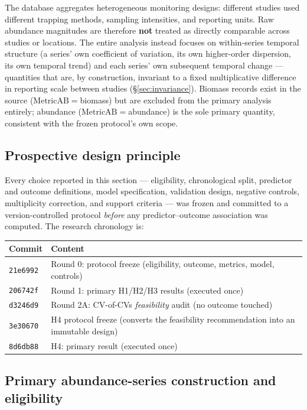 \documentclass[11pt]{article}
\begin{document}
The database aggregates heterogeneous monitoring designs: different
studies used different trapping methods, sampling intensities, and
reporting units. Raw abundance magnitudes are therefore \textbf{not}
treated as directly comparable across studies or locations. The entire
analysis instead focuses on within-series temporal structure (a series'
own coefficient of variation, its own higher-order dispersion, its own
temporal trend) and each series' own subsequent temporal change ---
quantities that are, by construction, invariant to a fixed multiplicative
difference in reporting scale between studies (\S\ref{sec:invariance}).
Biomass records exist in the source ($\mathrm{MetricAB}=$biomass) but are
excluded from the primary analysis entirely; abundance
($\mathrm{MetricAB}=$abundance) is the sole primary quantity, consistent
with the frozen protocol's own scope.

\subsection{Prospective design principle}

Every choice reported in this section --- eligibility, chronological
split, predictor and outcome definitions, model specification, validation
design, negative controls, multiplicity correction, and support criteria
--- was frozen and committed to a version-controlled protocol
\emph{before} any predictor--outcome association was computed. The
research chronology is:

\begin{center}
\begin{tabular}{@{}ll@{}}
\toprule
Commit & Content \\
\midrule
\texttt{21e6992} & Round 0: protocol freeze (eligibility, outcome, metrics, model, controls) \\
\texttt{206742f} & Round 1: primary H1/H2/H3 results (executed once) \\
\texttt{d3246d9} & Round 2A: CV-of-CVs \emph{feasibility} audit (no outcome touched) \\
\texttt{3e30670} & H4 protocol freeze (converts the feasibility recommendation into an immutable design) \\
\texttt{8d6db88} & H4: primary result (executed once) \\
\bottomrule
\end{tabular}
\end{center}

\subsection{Primary abundance-series construction and eligibility}
\end{document}
